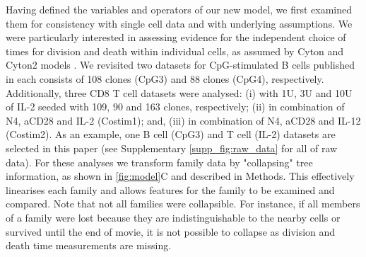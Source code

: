 \documentclass[11pt, a4paper]{article}
\begin{document}
Having defined the variables and operators of our new model, we first examined them for consistency with single cell data and with underlying assumptions. We were particularly interested in assessing evidence for the independent choice of times for division and death within individual cells, as assumed by Cyton and Cyton2 models \parencite{Gett.2000, Hawkins.2007}. We revisited two datasets for CpG-stimulated B cells published in \cite{Hawkins.2009} each consists of 108 clones (CpG3) and 88 clones (CpG4), respectively. Additionally, three CD8 T cell datasets were analysed: (i) with 1U, 3U and 10U of IL-2 seeded with 109, 90 and 163 clones, respectively; (ii) in combination of N4, aCD28 and IL-2 (Costim1); and, (iii) in combination of N4, aCD28 and IL-12 (Costim2). As an example, one B cell (CpG3) and T cell (IL-2) datasets are selected in this paper (see Supplementary \cref{supp_fig:raw_data} for all of raw data). For these analyses we transform family data by "collapsing" tree information, as shown in \cref{fig:model}C and described in Methods. This effectively linearises each family and allows features for the family to be examined and compared. Note that not all families were collapsible. For instance, if all members of a family were lost because they are indistinguishable to the nearby cells or survived until the end of movie, it is not possible to collapse as division and death time measurements are missing.
\end{document}
